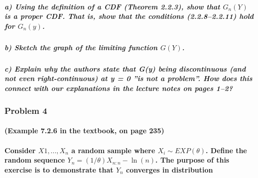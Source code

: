 \documentclass[
]{article}
\begin{document}
\hypertarget{a-using-the-definition-of-a-cdf-theorem-2.2.3-show-that-g_ny-is-a-proper-cdf.-that-is-show-that-the-conditions-2.2.82.2.11-hold-for-g_ny.}{%
\subparagraph{\texorpdfstring{a) Using the definition of a CDF (Theorem
2.2.3), show that \(G_n(Y)\) is a proper CDF. That is, show that the
conditions (2.2.8--2.2.11) hold for
\(G_n(y)\).}{a) Using the definition of a CDF (Theorem 2.2.3), show that G\_n(Y) is a proper CDF. That is, show that the conditions (2.2.8--2.2.11) hold for G\_n(y).}}\label{a-using-the-definition-of-a-cdf-theorem-2.2.3-show-that-g_ny-is-a-proper-cdf.-that-is-show-that-the-conditions-2.2.82.2.11-hold-for-g_ny.}}

\hypertarget{b-sketch-the-graph-of-the-limiting-function-gy.}{%
\subparagraph{\texorpdfstring{b) Sketch the graph of the limiting
function
\(G(Y)\).}{b) Sketch the graph of the limiting function G(Y).}}\label{b-sketch-the-graph-of-the-limiting-function-gy.}}

\hypertarget{c-explain-why-the-authors-state-that-gy-being-discontinuous-and-not-even-right-continuous-at-y-0-is-not-a-problem.-how-does-this-connect-with-our-explanations-in-the-lecture-notes-on-pages-12}{%
\subparagraph{c) Explain why the authors state that G(y) being
discontinuous (and not even right-continuous) at y = 0 ''is not a
problem''. How does this connect with our explanations in the lecture
notes on pages
1--2?}\label{c-explain-why-the-authors-state-that-gy-being-discontinuous-and-not-even-right-continuous-at-y-0-is-not-a-problem.-how-does-this-connect-with-our-explanations-in-the-lecture-notes-on-pages-12}}

\hypertarget{problem-4}{%
\subsubsection{Problem 4}\label{problem-4}}

\hypertarget{example-7.2.6-in-the-textbook-on-page-235}{%
\paragraph{(Example 7.2.6 in the textbook, on page
235)}\label{example-7.2.6-in-the-textbook-on-page-235}}

\hypertarget{consider-x1-.-.-.-x_n-a-random-sample-where-x_i-expux3b8.-define-the-random-sequence-y_n-1ux3b8x_nn-lnn.-the-purpose-of-this-exercise-is-to-demonstrate-that-y_n-converges-in-distribution}{%
\paragraph{\texorpdfstring{Consider \(X1, . . . , X_n\) a random sample
where \(X_i ∼ EXP(θ)\). Define the random sequence
\(Y_n = (1/θ)X_{n:n} − \ln(n)\). The purpose of this exercise is to
demonstrate that \(Y_n\) converges in
distribution}{Consider X1, . . . , X\_n a random sample where X\_i ∼ EXP(θ). Define the random sequence Y\_n = (1/θ)X\_\{n:n\} − \textbackslash ln(n). The purpose of this exercise is to demonstrate that Y\_n converges in distribution}}\label{consider-x1-.-.-.-x_n-a-random-sample-where-x_i-expux3b8.-define-the-random-sequence-y_n-1ux3b8x_nn-lnn.-the-purpose-of-this-exercise-is-to-demonstrate-that-y_n-converges-in-distribution}}
\end{document}
